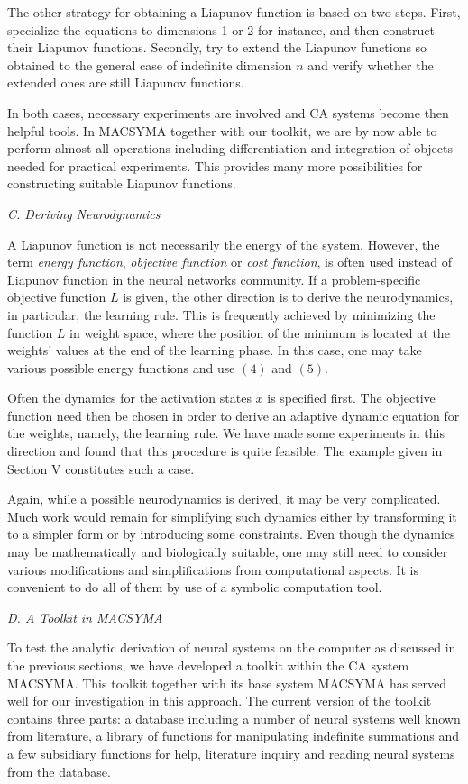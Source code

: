 The other strategy for obtaining a Liapunov function is based on two
steps. 
First, specialize the equations to dimensions 1 or 2 for instance,   
and then construct their Liapunov functions. Secondly, try to extend the 
Liapunov functions so obtained to the general case of indefinite
dimension 
$n$ and verify 
whether the extended ones are still Liapunov functions. 

In both cases, necessary experiments are involved and CA 
systems become then helpful tools. In MACSYMA together with our toolkit, 
we are by now able to perform almost all operations including
differentiation 
and integration of objects needed for practical experiments. 
This provides many more possibilities for constructing suitable
Liapunov functions.

\bigskip
\noindent
{\em C. Deriving Neurodynamics}

\smallskip
A Liapunov function is not necessarily the energy of the 
system. However, the term {\em energy function}, {\em objective
function\/} 
or {\em cost function}, is often used instead of Liapunov function in 
the neural networks community. 
If a problem-specific objective function $L$ is given,
the other direction is to derive the neurodynamics, in particular,
the learning rule. This is frequently achieved by minimizing the
function 
$L$ in weight space, where the position of the minimum is located at the 
weights' values at the end of the learning phase.
In this case, one may take various possible energy functions and 
use $(4)$ and $(5)$. 

Often the dynamics for the activation states $x$ is specified first. The
objective function need then be chosen in order to derive an adaptive
dynamic 
equation for the weights, namely, the learning rule. We have made some
experiments in this direction and found that this procedure is quite
feasible. 
The example given in Section V constitutes such a case.

Again, while a possible neurodynamics is derived, it may be very
complicated. 
Much work would remain for simplifying such dynamics either by
transforming 
it to a simpler form or by introducing some constraints. Even though the 
dynamics may be mathematically and biologically suitable, one may still
need to 
consider various modifications and simplifications from computational
aspects.
It is convenient to do all of them by use of a symbolic computation
tool.

\bigskip
\noindent
{\em D. A Toolkit in MACSYMA}

\smallskip
To test the analytic derivation of neural systems on the computer as 
discussed in the previous sections, we have developed a toolkit within
the
CA system MACSYMA. This toolkit together
with its base system MACSYMA has served well for our investigation in
this 
approach. The current version of the toolkit contains three parts: a
database 
including a number of neural systems well known from literature, a
library of 
functions for manipulating indefinite summations and a few subsidiary
functions 
for help, literature inquiry and reading neural systems from the
database.

